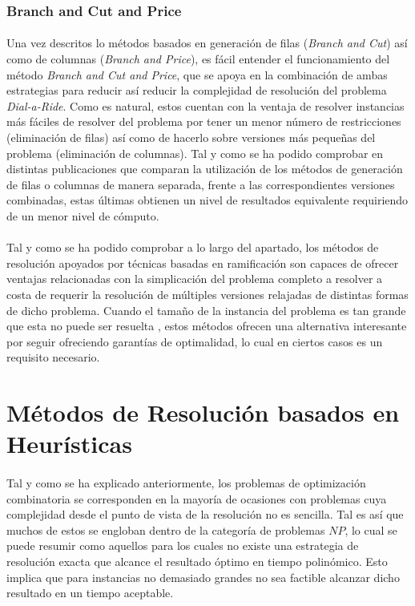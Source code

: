 \documentclass{subfiles}
\begin{document}
        \subsubsection{Branch and Cut and Price}
        \label{sec:solving_branch_cut_price}

          \paragraph{}
          Una vez descritos lo métodos basados en generación de filas (\emph{Branch and Cut}) así como de columnas (\emph{Branch and Price}), es fácil entender el funcionamiento del método \emph{Branch and Cut and Price}, que se apoya en la combinación de ambas estrategias para reducir así reducir la complejidad de resolución del problema \emph{Dial-a-Ride}. Como es natural, estos cuentan con la ventaja de resolver instancias más fáciles de resolver del problema por tener un menor número de restricciones (eliminación de filas) así como de hacerlo sobre versiones más pequeñas del problema (eliminación de columnas). Tal y como se ha podido comprobar en distintas publicaciones que comparan la utilización de los métodos de generación de filas o columnas de manera separada, frente a las correspondientes versiones combinadas, estas últimas obtienen un nivel de resultados equivalente requiriendo de un menor nivel de cómputo. 

      \paragraph{}
      Tal y como se ha podido comprobar a lo largo del apartado, los métodos de resolución apoyados por técnicas basadas en ramificación son capaces de ofrecer ventajas relacionadas con la simplicación del problema completo a resolver a costa de requerir la resolución de múltiples versiones relajadas de distintas formas de dicho problema. Cuando el tamaño de la instancia del problema es tan grande que esta no puede ser resuelta , estos métodos ofrecen una alternativa interesante por seguir ofreciendo garantías de optimalidad, lo cual en ciertos casos es un requisito necesario.

    \section{Métodos de Resolución basados en Heurísticas}
    \label{sec:solving_heuristics}

      \paragraph{}
      Tal y como se ha explicado anteriormente, los problemas de optimización combinatoria se corresponden en la mayoría de ocasiones con problemas cuya complejidad desde el punto de vista de la resolución no es sencilla. Tal es así que muchos de estos se engloban dentro de la categoría de problemas $NP$, lo cual se puede resumir como aquellos para los cuales no existe una estrategia de resolución exacta que alcance el resultado óptimo en tiempo polinómico. Esto implica que para instancias no demasiado grandes no sea factible alcanzar dicho resultado en un tiempo aceptable. 
\end{document}
